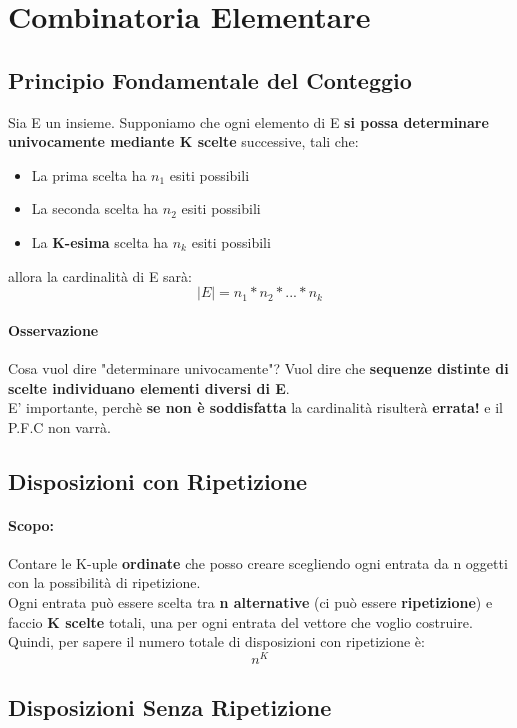 \documentclass{report}
\begin{document}
\section{Combinatoria Elementare}
\subsection{Principio Fondamentale del Conteggio}
Sia E un insieme. Supponiamo che ogni elemento di E \textbf{si possa determinare univocamente mediante K scelte }successive, tali che: \begin{itemize}
    \item La prima scelta ha \(n_1\) esiti possibili
    \item La seconda scelta ha \(n_2\) esiti possibili
    \item La \textbf{K-esima} scelta ha \(n_k\) esiti possibili
\end{itemize}
allora la cardinalità di E sarà: \[|E| = n_1*n_2*...*n_k\]
\paragraph{Osservazione} Cosa vuol dire "determinare univocamente"? Vuol dire che \textbf{sequenze distinte di scelte individuano elementi diversi di E}.\\ 
E' importante, perchè \textbf{se non è soddisfatta} la cardinalità risulterà \textbf{errata!} e il P.F.C non varrà.
\subsection{Disposizioni con Ripetizione}
\paragraph{Scopo:} Contare le K-uple \textbf{ordinate} che posso creare scegliendo ogni entrata da n oggetti con la possibilità di ripetizione.\\
Ogni entrata può essere scelta tra \textbf{n alternative} (ci può essere \textbf{ripetizione}) e faccio \textbf{K scelte} totali, una per ogni entrata del vettore che voglio costruire. Quindi, per sapere il numero totale di disposizioni con ripetizione è: \[n^K\]
\subsection{Disposizioni Senza Ripetizione}
\end{document}
